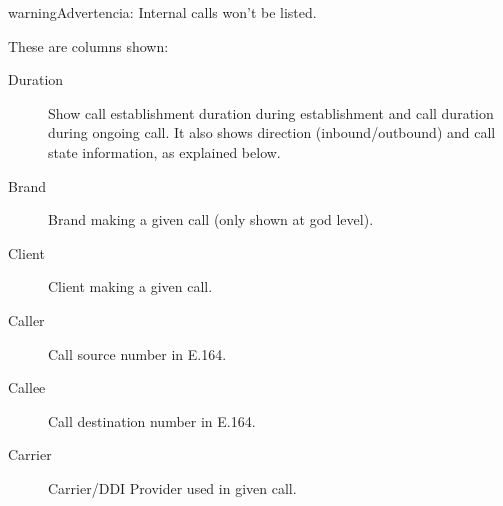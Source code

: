 \documentclass[letterpaper,10pt,spanish]{sphinxmanual}
\begin{document}
\begin{notice}{warning}{Advertencia:}
Internal calls won't be listed.
\end{notice}

These are columns shown:
\begin{description}
\item[{Duration}] \leavevmode{}\label{administration_portal/brand/calls/active_calls:term-duration}
Show call establishment duration during establishment and call duration during ongoing call. It also shows
direction (inbound/outbound) and call state information, as explained below.

\item[{Brand}] \leavevmode{}\label{administration_portal/brand/calls/active_calls:term-brand}
Brand making a given call (only shown at god level).

\item[{Client}] \leavevmode{}\label{administration_portal/brand/calls/active_calls:term-client}
Client making a given call.

\item[{Caller}] \leavevmode{}\label{administration_portal/brand/calls/active_calls:term-caller}
Call source number in E.164.

\item[{Callee}] \leavevmode{}\label{administration_portal/brand/calls/active_calls:term-callee}
Call destination number in E.164.

\item[{Carrier}] \leavevmode{}\label{administration_portal/brand/calls/active_calls:term-carrier}
Carrier/DDI Provider used in given call.

\end{description}
\end{document}
